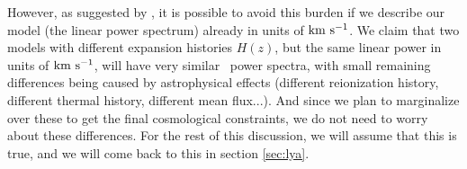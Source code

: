 However, as suggested by \cite{McDonald2005a}, it is possible to avoid this
burden if we describe our model (the linear power spectrum) already in 
units of ${\rm km~s^{-1}}$.
We claim that two models with different expansion histories $H(z)$, but the
same linear power in units of ${\rm km~s^{-1}}$, will have very similar \lya\ power
spectra, with small remaining differences being caused by astrophysical 
effects (different reionization history, different thermal history, different
mean flux...). 
And since we plan to marginalize over these to get the final cosmological 
constraints, we do not need to worry about these differences. 
For the rest of this discussion, we will assume that this is true, and we 
will come back to this in section \ref{sec:lya}.


